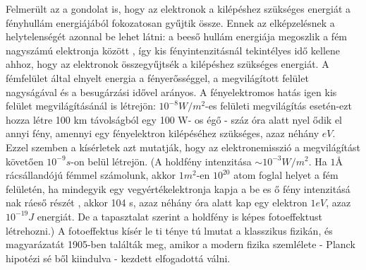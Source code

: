 \documentclass[a4paper,12pt]{article}
\begin{document}
Felmerült az a gondolat is, hogy az elektronok a kilépéshez szükséges energiát a fényhullám energiájából fokozatosan gyűjtik össze. Ennek az elképzelésnek a helytelenségét azonnal be lehet látni: a beeső hullám energiája
megoszlik a fém nagyszámú elektronja között , így kis fényintenzitásnál tekintélyes idő kellene ahhoz, hogy az elektronok összegyűjtsék a kilépéshez szükséges energiát. A fémfelület által elnyelt energia a fényerősséggel,
a megvilágított felület nagyságával és a besugárzási idővel arányos. A fényelektromos hatás igen kis felület megvilágításánál is létrejön: $10^{-8} W/m^2$-es felületi megvilágítás esetén-ezt hozza létre 100 km távolságból egy 100 W-
os égő - száz óra alatt nyel ődik el annyi fény, amennyi egy fényelektron kilépéséhez szükséges, azaz néhány $eV$. Ezzel szemben a kísérletek azt mutatják, hogy az elektronemisszió a megvilágítást követően $10^{-9} s$-on belül
létrejön. (A holdfény intenzitása $\sim 10^{-3} W/m^2$. Ha $1 \text{\AA}$ rácsállandójú fémmel számolunk, akkor $1 m^2$-en $10^{20}$ atom foglal helyet a fém felületén, ha mindegyik egy vegyértékelektronja kapja a be es ő fény intenzitásá nak ráeső részét , akkor 104 s, azaz néhány óra alatt kap egy elektron $1 eV$, azaz
$10^{-19} J$ energiát. De a tapasztalat szerint a holdfény is képes fotoeffektust létrehozni.) A fotoeffektus kísér le ti ténye tú lmutat a klasszikus fizikán, és magyarázatát 1905-ben találták meg, amikor a modern fizika szemlélete -
Planck hipotézi sé ből kiindulva - kezdett elfogadottá válni.
\end{document}
